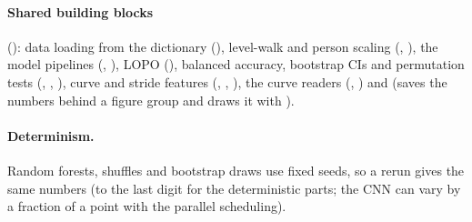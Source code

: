 \paragraph{Shared building blocks} (): data loading from the dictionary (), level-walk and person scaling
(, ), the model pipelines (, ), LOPO (), balanced accuracy,
bootstrap CIs and permutation tests (, , ), curve and stride features (,
, ), the curve readers (, ) and  (saves the
numbers behind a figure group and draws it with ).

\paragraph{Determinism.} Random forests, shuffles and bootstrap draws use fixed seeds, so a rerun gives the same numbers
(to the last digit for the deterministic parts; the CNN can vary by a fraction of a point with the parallel scheduling).
